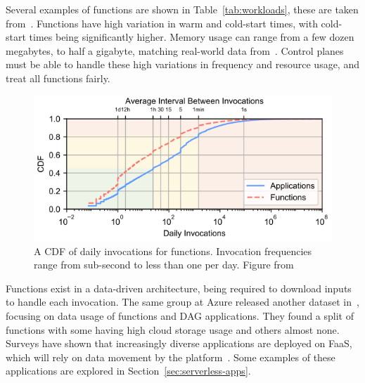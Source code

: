 Several examples of functions are shown in Table~\ref*{tab:workloads}, these are taken from~\cite{functionbench}.
Functions have high variation in warm and cold-start times, with cold-start times being significantly higher.
Memory usage can range from a few dozen megabytes, to half a gigabyte, matching real-world data from~\cite{shahrad_serverless_2020}.
Control planes must be able to handle these high variations in frequency and resource usage, and treat all functions fairly.

\begin{figure}
  \begin{center}
    \includegraphics[width=.9\columnwidth]{./figures/wild-invocations.png}
    \caption{A CDF of daily invocations for functions. 
              Invocation frequencies range from sub-second to less than one per day. 
              Figure from~\cite{shahrad_serverless_2020}}
  \label{fig:wild-invokes}
\end{center}
\end{figure}

Functions exist in a data-driven architecture, being required to download inputs to handle each invocation.
The same group at Azure released another dataset in~\cite{romero2021faa}, focusing on data usage of functions and DAG applications.
They found a split of functions with some having high cloud storage usage and others almost none.
Surveys have shown that increasingly diverse applications are deployed on FaaS, which will rely on data movement by the platform~\cite{raza2021sok,hossein2022survey,eismann2020serverless}.
Some examples of these applications are explored in Section~\ref{sec:serverless-apps}.


